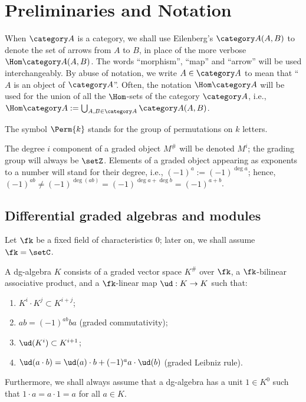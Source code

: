 

\chapter{Preliminaries and Notation}
\label{cha:prelim}

When $\A$ is a category, we shall use Eilenberg's $\A(A, B)$ to denote
the set of arrows from $A$ to $B$, in place of the more verbose $\Hom
\A(A, B)$.  The words ``morphism'', ``map'' and ``arrow'' will be used
interchangeably.  By abuse of notation, we write $A \in \A$ to mean that
``$A$ is an object of $\A$''. Often, the notation $\Hom\A$ will be
used for the union of all the $\Hom$-sets of the category $\A$, i.e.,
$\Hom\A := \bigcup_{A,B \in \A} \A(A,B)$.

The symbol $\Perm{k}$ stands for the group of permutations on $k$
letters.

The degree $i$ component of a graded object $M^\#$ will be denoted
$M^i$; the grading group will always be $\setZ$. Elements of a graded
object appearing as exponents to a number will stand for their degree,
i.e., $(-1)^a := (-1)^{\deg a}$; hence, $(-1)^{ab} \not=
(-1)^{\deg (ab)} = (-1)^{\deg a + \deg b} = (-1)^{a+b}$.


\section{Differential graded algebras and modules}
\label{sec:dg-things}

Let $\fk$ be a fixed field of characteristics $0$; later on, we shall
assume $\fk = \setC$.
\begin{definition}
  A dg-algebra $K$ consists of a graded vector space $K^\#$ over $\fk$,
  a $\fk$-bilinear associative product, and a $\fk$-linear map $\ud:
  K\to K$ such that:
  \begin{enumerate}
  \item $K^i \cdot K^j \subset K^{i+j}$;
  \item $ab = (-1)^{ab} ba$ (graded commutativity);
  \item $\ud(K^i) \subset K^{i+1}$;
  \item $\ud(a\cdot b) = \ud(a)\cdot b + (-1)^a a\cdot\ud(b)$ (graded Leibniz rule).
  \end{enumerate}
  Furthermore, we shall always assume that a dg-algebra has a unit
  $1\in K^0$ such that $1\cdot a = a\cdot 1 = a$ for all $a\in
  K$.
\end{definition}

